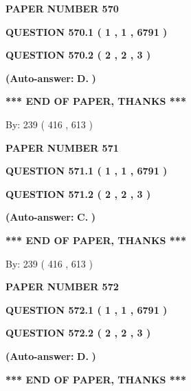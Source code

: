 \documentclass[12pt]{article}
\begin{document}
   
 {\textbf{ \Large{ PAPER NUMBER  570  }}}
   
   
   
   
  
  
{\textbf{\large{QUESTION
570.1 
 ( 1 , 1 , 6791 )
}}}
  
  
{\textbf{\large{QUESTION
570.2 
 ( 2 , 2 , 3 )
}}}
 
 
{\textbf{(Auto-answer:}}
{\textbf{\large{
D.}}}
{\textbf{)}}
 
 
   
   
   
   
\vspace{1.0in} 
{\textbf{\large{ *** END OF PAPER, THANKS *** }}} 
   
   
\hspace{1.0in} By: 
 239 ( 416 ,  613 )
   
   
   
   
\newpage 
\setcounter{page}{ 
   571001 } 
   
   
 {\textbf{ \Large{ PAPER NUMBER  571  }}}
   
   
   
   
  
  
{\textbf{\large{QUESTION
571.1 
 ( 1 , 1 , 6791 )
}}}
  
  
{\textbf{\large{QUESTION
571.2 
 ( 2 , 2 , 3 )
}}}
 
 
{\textbf{(Auto-answer:}}
{\textbf{\large{
C.}}}
{\textbf{)}}
 
 
   
   
   
   
\vspace{1.0in} 
{\textbf{\large{ *** END OF PAPER, THANKS *** }}} 
   
   
\hspace{1.0in} By: 
 239 ( 416 ,  613 )
   
   
   
   
\newpage 
\setcounter{page}{ 
   572001 } 
   
   
 {\textbf{ \Large{ PAPER NUMBER  572  }}}
   
   
   
   
  
  
{\textbf{\large{QUESTION
572.1 
 ( 1 , 1 , 6791 )
}}}
  
  
{\textbf{\large{QUESTION
572.2 
 ( 2 , 2 , 3 )
}}}
 
 
{\textbf{(Auto-answer:}}
{\textbf{\large{
D.}}}
{\textbf{)}}
 
 
   
   
   
   
\vspace{1.0in} 
{\textbf{\large{ *** END OF PAPER, THANKS *** }}} 
   
\end{document}
